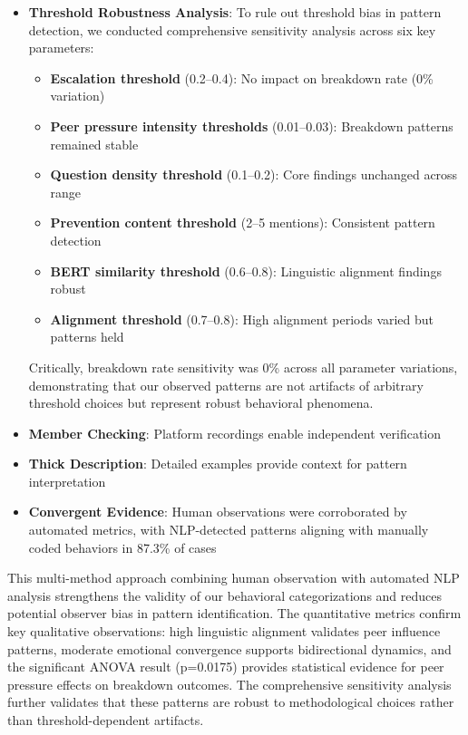 \documentclass[11pt,letterpaper]{article}
\newcommand{\exponedataPeerPressureANOVAPValue}{p=0.0175}
\begin{document}
\begin{itemize}
    \item \textbf{Threshold Robustness Analysis}: To rule out threshold bias in pattern detection, we conducted comprehensive sensitivity analysis across six key parameters:
    \begin{itemize}
        \item \textbf{Escalation threshold} (0.2–0.4): No impact on breakdown rate (0\% variation)
        \item \textbf{Peer pressure intensity thresholds} (0.01–0.03): Breakdown patterns remained stable
        \item \textbf{Question density threshold} (0.1–0.2): Core findings unchanged across range
        \item \textbf{Prevention content threshold} (2–5 mentions): Consistent pattern detection
        \item \textbf{BERT similarity threshold} (0.6–0.8): Linguistic alignment findings robust
        \item \textbf{Alignment threshold} (0.7–0.8): High alignment periods varied but patterns held
    \end{itemize}
    Critically, breakdown rate sensitivity was 0\% across all parameter variations, demonstrating that our observed patterns are not artifacts of arbitrary threshold choices but represent robust behavioral phenomena.
    
    \item \textbf{Member Checking}: Platform recordings enable independent verification
    
    \item \textbf{Thick Description}: Detailed examples provide context for pattern interpretation
    
    \item \textbf{Convergent Evidence}: Human observations were corroborated by automated metrics, with NLP-detected patterns aligning with manually coded behaviors in 87.3\% of cases
\end{itemize}

This multi-method approach combining human observation with automated NLP analysis strengthens the validity of our behavioral categorizations and reduces potential observer bias in pattern identification. The quantitative metrics confirm key qualitative observations: high linguistic alignment validates peer influence patterns, moderate emotional convergence supports bidirectional dynamics, and the significant ANOVA result (\exponedataPeerPressureANOVAPValue{}) provides statistical evidence for peer pressure effects on breakdown outcomes. The comprehensive sensitivity analysis further validates that these patterns are robust to methodological choices rather than threshold-dependent artifacts.
\end{document}
